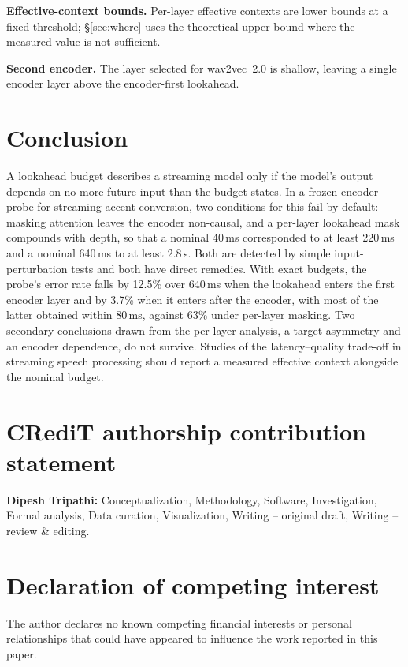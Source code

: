 \documentclass[preprint,12pt,authoryear]{elsarticle}
\begin{document}
\textbf{Effective-context bounds.} Per-layer effective contexts are lower
bounds at a fixed threshold; \S\ref{sec:where} uses the theoretical upper
bound where the measured value is not sufficient.

\textbf{Second encoder.} The layer selected for wav2vec~2.0 is shallow,
leaving a single encoder layer above the encoder-first lookahead.

\section{Conclusion}

A lookahead budget describes a streaming model only if the model's output
depends on no more future input than the budget states. In a frozen-encoder
probe for streaming accent conversion, two conditions for this fail by
default: masking attention leaves the encoder non-causal, and a per-layer
lookahead mask compounds with depth, so that a nominal 40\,ms corresponded to
at least 220\,ms and a nominal 640\,ms to at least 2.8\,s. Both are detected by
simple input-perturbation tests and both have direct remedies. With exact
budgets, the probe's error rate falls by 12.5\% over 640\,ms when the
lookahead enters the first encoder layer and by 3.7\% when it enters after the
encoder, with most of the latter obtained within 80\,ms, against 63\% under
per-layer masking. Two secondary conclusions drawn from the per-layer
analysis, a target asymmetry and an encoder dependence, do not survive.
Studies of the latency--quality trade-off in streaming speech processing
should report a measured effective context alongside the nominal budget.

\section*{CRediT authorship contribution statement}

\textbf{Dipesh Tripathi:} Conceptualization, Methodology, Software,
Investigation, Formal analysis, Data curation, Visualization, Writing --
original draft, Writing -- review \& editing.

\section*{Declaration of competing interest}

The author declares no known competing financial interests or personal
relationships that could have appeared to influence the work
reported in this paper.
\end{document}
